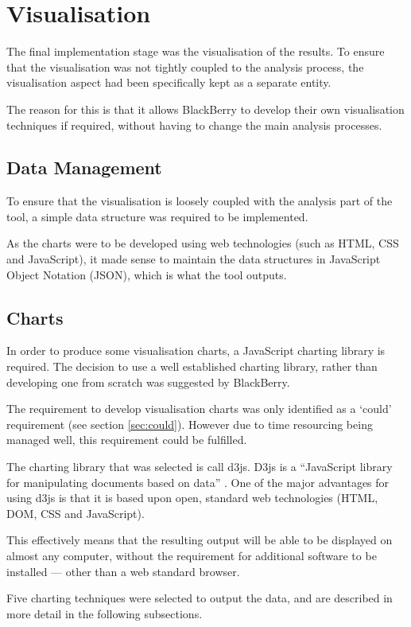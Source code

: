 \section{Visualisation}
The final implementation stage was the visualisation of the results. To ensure 
that the visualisation was not tightly coupled to the analysis process, the 
visualisation aspect had been specifically kept as a separate entity.

The reason for this is that it allows BlackBerry to develop their own 
visualisation techniques if required, without having to change the main 
analysis processes.

\subsection{Data Management}
To ensure that the visualisation is loosely coupled with the analysis part of 
the tool, a simple data structure was required to be implemented.

As the charts were to be developed using web technologies (such as HTML, CSS 
and JavaScript), it made sense to maintain the data structures in JavaScript 
Object Notation (JSON), which is what the tool outputs.

\subsection{Charts}
In order to produce some visualisation charts, a JavaScript charting library is
required. The decision to use a well established charting library, rather than 
developing one from scratch was suggested by BlackBerry.

The requirement to develop visualisation charts was only identified as a 
`could' requirement (see section \ref{sec:could}). However due to time 
resourcing being managed well, this requirement could be fulfilled.

The charting library that was selected is call d3js. D3js is a ``JavaScript 
library for manipulating documents based on data'' \citep{d3js}. One of the 
major advantages for using d3js is that it is based upon open, standard web 
technologies (HTML, DOM, CSS and JavaScript).

This effectively means that the resulting output will be able to be displayed 
on almost any computer, without the requirement for additional software to be
installed --- other than a web standard browser.

Five charting techniques were selected to output the data, and are described in
more detail in the following subsections.


